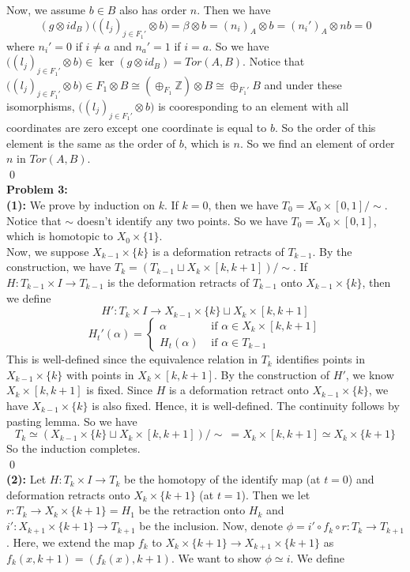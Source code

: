 \documentclass[12pt]{amsart}
\newcommand{\Z}{\mathbb{Z}}
\begin{document}
Now, we assume $b\in B$ also has order $n$. Then we have 
\[(g\otimes id_B)\Big((l_j)_{j\in F_1'}\otimes b\Big)=\beta\otimes b=(n_i)_A\otimes b=(n_i')_A\otimes nb=0\]
where $n_i'=0$ if $i\neq a$ and $n_a'=1$ if $i=a$.
So we have $\Big((l_j)_{j\in F_1'}\otimes b\Big)\in \ker(g\otimes id_B)=Tor(A,B)$. Notice that $\Big((l_j)_{j\in F_1'}\otimes b\Big)\in F_1\otimes B\cong (\oplus_{F_1}\Z)\otimes B\cong \oplus_{F_1'}B$ and under these isomorphisms, $\Big((l_j)_{j\in F_1'}\otimes b\Big)$ is cooresponding to an element with all coordinates are zero except one coordinate is equal to $b$. So the order of this element is the same as the order of $b$, which is $n$. So we find an element of order $n$ in $Tor(A,B)$.
\\\qed\\
\textbf{Problem 3:}\\
\textbf{(1):} We prove by induction on $k$. If $k=0$, then we have $T_0=X_0\times [0,1]/\sim$. Notice that $\sim$ doesn't identify any two points. So we have $T_0=X_0\times [0,1]$, which is homotopic to $X_0\times \{1\}$.\\
Now, we suppose $X_{k-1}\times\{k\} $ is a deformation retracts of $T_{k-1}$. By the construction, we have $T_k=(T_{k-1}\sqcup X_k\times [k,k+1])/\sim$. If $H:T_{k-1}\times I\to T_{k-1}$ is the deformation retracts of $T_{k-1}$ onto $X_{k-1}\times \{k\}$, then we define 
\[H':T_k\times I\to X_{k-1}\times \{k\}\sqcup X_k\times [k,k+1]\]
\[H_t'(\alpha)=\begin{cases}
    \alpha &\text{ if } \alpha\in X_k\times [k,k+1]\\
    H_t(\alpha) &\text{ if }\alpha\in T_{k-1}
\end{cases}\]
This is well-defined since the equivalence relation in $T_k$ identifies points in $X_{k-1}\times\{k\}$ with points in $X_k\times [k,k+1]$. By the construction of $H'$, we know $X_k\times [k,k+1]$ is fixed. Since $H$ is a deformation retract onto $X_{k-1}\times \{k\}$, we have $X_{k-1}\times\{k\}$ is also fixed. Hence, it is well-defined. The continuity follows by pasting lemma. So we have 
\[T_k\simeq (X_{k-1}\times\{k\}\sqcup X_k\times [k,k+1])/\sim\ =X_k\times [k,k+1]\simeq X_k\times \{k+1\}\]
So the induction completes.
\\\qed\\
\textbf{(2):} Let $H:T_k\times I \to T_k$ be the homotopy of the identify map (at $t=0$) and deformation retracts onto $X_k\times \{k+1\}$ (at $t=1$). Then we let $r:T_k\to X_k\times \{k+1\}= H_1$ be the retraction onto $H_k$ and $i':X_{k+1}\times \{k+1\}\to T_{k+1}$ be the inclusion. Now, denote $\phi=i'\circ f_k\circ r: T_k\to T_{k+1}$. Here, we extend the map $f_k$ to $X_k\times \{k+1\}\to X_{k+1}\times \{k+1\}$ as $f_k(x,k+1)=(f_k(x),k+1)$. We want to show $\phi\simeq i$. We define 
\end{document}
